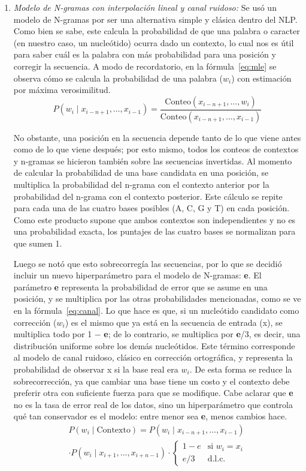 \documentclass[sigconf,nonacm]{acmart}
\begin{document}
\begin{enumerate}
\item \emph{Modelo de N-gramas con interpolación lineal y canal ruidoso:} Se usó un modelo de N-gramas por ser una alternativa simple y clásica dentro del NLP. Como bien se sabe, este calcula la probabilidad de que una palabra o caracter (en nuestro caso, un nucleótido) ocurra dado un contexto, lo cual nos es útil para saber cuál es la palabra con más probabilidad para una posición y corregir la secuencia. A modo de recordatorio, en la fórmula~\eqref{eq:mle} se observa cómo se calcula la probabilidad de una palabra (\(w_{i}\)) con estimación por máxima verosimilitud.
\begin{equation}\label{eq:mle}
P(w_{i}\mid x_{i-n+1},\ldots,x_{i-1}) = \frac{\mathrm{Conteo}(x_{i-n+1},\ldots,w_{i})}{\mathrm{Conteo}(x_{i-n+1},\ldots,x_{i-1})}
\end{equation}

No obstante, una posición en la secuencia depende tanto de lo que viene antes como de lo que viene después; por esto mismo, todos los conteos de contextos y n-gramas se hicieron también sobre las secuencias invertidas. Al momento de calcular la probabilidad de una base candidata en una posición, se multiplica la probabilidad del n-grama con el contexto anterior por la probabilidad del n-grama con el contexto posterior. Este cálculo se repite para cada una de las cuatro bases posibles (A, C, G y T) en cada posición. Como este producto supone que ambos contextos son independientes y no es una probabilidad exacta, los puntajes de las cuatro bases se normalizan para que sumen 1.

Luego se notó que esto sobrecorregía las secuencias, por lo que se decidió incluir un nuevo hiperparámetro para el modelo de N-gramas: \textbf{e}. El parámetro \textbf{e} representa la probabilidad de error que se asume en una posición, y se multiplica por las otras probabilidades mencionadas, como se ve en la fórmula~\eqref{eq:canal}. Lo que hace es que, si un nucleótido candidato como corrección (\(w_{i}\)) es el mismo que ya está en la secuencia de entrada (x), se multiplica todo por 1 − \textbf{e}; de lo contrario, se multiplica por \textbf{e}/3, es decir, una distribución uniforme sobre los demás nucleótidos. Este término corresponde al modelo de canal ruidoso, clásico en corrección ortográfica, y representa la probabilidad de observar x si la base real era \(w_{i}\). De esta forma se reduce la sobrecorrección, ya que cambiar una base tiene un costo y el contexto debe preferir otra con suficiente fuerza para que se modifique. Cabe aclarar que \textbf{e} no es la tasa de error real de los datos, sino un hiperparámetro que controla qué tan conservador es el modelo: entre menor sea \textbf{e}, menos cambios hace.
\begin{multline}\label{eq:canal}
P(w_{i}\mid \mathrm{Contexto}) = P(w_{i}\mid x_{i-n+1},\ldots,x_{i-1})\\
\cdot P(w_{i}\mid x_{i+1},\ldots,x_{i+n-1}) \cdot \begin{cases} 1-e & \text{si } w_{i}=x_{i}\\ e/3 & \text{d.l.c.} \end{cases}
\end{multline}


\end{enumerate}
\end{document}

